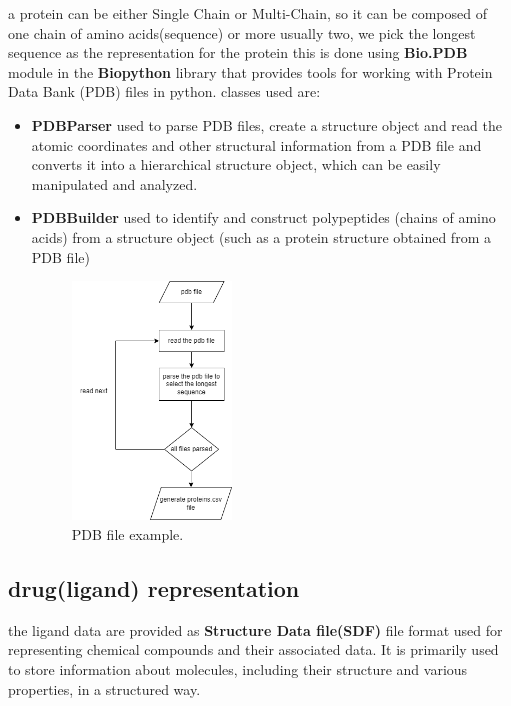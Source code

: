 \documentclass[11pt, a4paper]{article}
\begin{document}
    a protein can be either Single Chain or Multi-Chain, so it can be composed of one chain of amino acids(sequence) or more usually two, we pick the longest sequence as the representation for the protein
    this is done using \textbf{Bio.PDB} module in the \textbf{Biopython} library that provides tools for working with Protein Data Bank (PDB) files in python. classes used are:
    \begin{itemize}
        \item \textbf{PDBParser} used to parse PDB files, create a structure object and read the atomic coordinates and other structural information from a PDB file and converts it into a hierarchical structure object, which can be easily manipulated and analyzed. 
        \item \textbf{PDBBuilder} used to identify and construct polypeptides (chains of amino acids) from a structure object (such as a protein structure obtained from a PDB file)             
    
        \begin{figure}[h]
            \centering
            \includegraphics[width=0.4\textwidth]{pdb parser.png} %
            \caption{PDB file example.}
            \label{fig 4}
        \end{figure}

    \end{itemize} 

    \subsection{drug(ligand) representation}
    the ligand data are provided as \textbf{Structure Data file(SDF)} file format used for representing chemical compounds and their associated data. It is primarily used to store information about molecules, including their structure and various properties, in a structured way.
\end{document}
